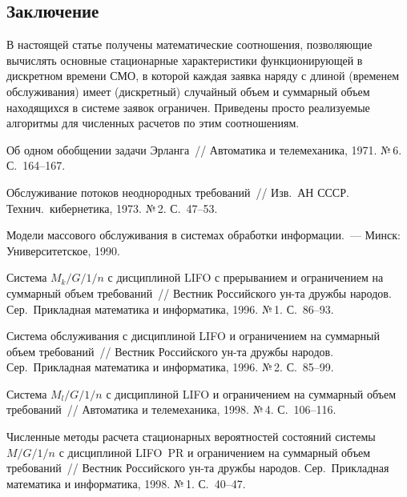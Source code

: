 \begin{multicols}{2}
\section{Заключение}

В настоящей статье получены математические
соотношения, позволяющие вычислять основные стационарные
характеристики функционирующей в дискретном времени СМО,
в которой каждая заявка наряду с длиной (временем
обслуживания) имеет (дискретный) случайный объем и суммарный объем находящихся в
системе заявок ограничен. Приведены просто реализуемые алгоритмы для численных
расчетов по этим соотношениям.

{\small\frenchspacing
{%
\begin{thebibliography}{99}


Об одном обобщении задачи Эрланга~//
Автоматика и телемеханика, 1971. №\,6. С.~164--167.

Обслуживание потоков неоднородных требований~//
Изв.\ АН СССР. Технич.\ кибернетика, 1973. №\,2. С.~47--53.

Модели массового обслуживания в системах обработки
информации.~--- Минск: Университетское, 1990.

Система $M_k/G/1/n$ с дисциплиной LIFO с прерыванием и
ограничением на суммарный объем требований~//
Вестник Российского ун-та дружбы народов.
Сер.\ Прикладная математика и информатика, 1996. №\,1.
С.~86--93.

Система обслуживания с дисциплиной LIFO и ограничением
на суммарный объем требований~//
Вестник Российского ун-та дружбы народов.
Сер.\ Прикладная математика и информатика, 1996. №\,2.
С.~85--99.

Система $M_l/G/1/n$ с дисциплиной LIFO и ограничением на
суммарный объем требований~//
Автоматика и телемеханика, 1998. №\,4. С.~106--116.

Численные методы расчета стационарных вероятностей
состояний системы $M/G/1/n$ с дисциплиной LIFO\ PR\/
и ограничением на суммарный объем требований~//
Вестник Российского ун-та дружбы народов. Сер.\ Прикладная математика и
информатика, 1998. №\,1. С.~40--47.




\end{thebibliography}}}
\end{multicols}
